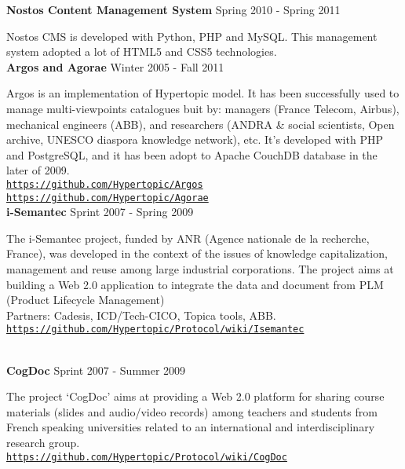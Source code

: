 \documentclass[10pt]{article}
\newcommand{\halfblankline}{\quad\vspace{-0.5\baselineskip}\pagebreak[3]}
\providecommand*\url[1]{\href{#1}{#1}}
\renewcommand*\url[1]{\href{#1}{\texttt{#1}}}
\begin{document}
\textbf{Nostos Content Management System}
\hfill Spring 2010 - Spring 2011

\halfblankline

Nostos CMS is developed with Python, PHP and MySQL. This management system adopted a lot of HTML5 and CSS5 technologies. \\


\textbf{Argos and Agorae}
\hfill Winter 2005 - Fall 2011

\halfblankline

Argos is an  implementation of Hypertopic model. It has been successfully used to manage multi-viewpoints catalogues buit by: managers (France Telecom, Airbus), mechanical engineers (ABB), and researchers (ANDRA \& social scientists, Open archive, UNESCO diaspora knowledge network), etc.
It's developed with PHP and PostgreSQL, and it has been adopt to Apache CouchDB database in the later of 2009. \\
\url{https://github.com/Hypertopic/Argos} \\
\url{https://github.com/Hypertopic/Agorae} \\


\textbf{i-Semantec}
\hfill Sprint 2007 - Spring 2009

\halfblankline

The i-Semantec project, funded by ANR (Agence nationale de la recherche, France), was developed in the context of the issues of knowledge capitalization, management and reuse among large industrial corporations.  The project aims at building a Web 2.0 application to integrate the data and document from PLM (Product Lifecycle Management) \\
Partners: Cadesis, ICD/Tech-CICO, Topica tools, ABB.\\
\url{https://github.com/Hypertopic/Protocol/wiki/Isemantec} \\\



\halfblankline

\textbf{CogDoc}
\hfill Sprint 2007 - Summer 2009

\halfblankline

The project ‘CogDoc’ aims at providing a Web 2.0 platform for sharing course materials (slides and audio/video records) among teachers and students from French speaking universities related to an international and interdisciplinary research group. \\
\url{https://github.com/Hypertopic/Protocol/wiki/CogDoc} \\
\end{document}
